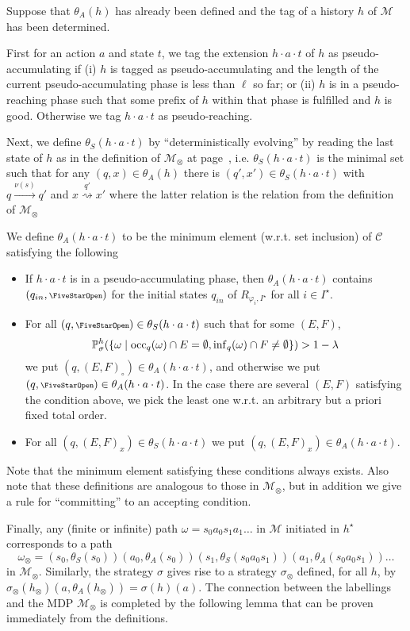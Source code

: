 \documentclass[a4paper,UKenglish]{lipics}
\newcommand{\symbopen}{\text{\scriptsize\FiveStarOpen}}
\newcommand{\tran}[1]{\stackrel{#1}{\rightarrow}}
\newcommand{\mdp}{\mathcal{M}}
\renewcommand{\Pr}[3][]{\ifblank{#1}{\mathbb{P}_{#2}}{\mathbb{P}^{#1}_{#2}}(#3)}
\newcommand{\rabin}{R}
\newcommand{\fix}[1]{{#1^\star}}
\newcommand{\fixI}{\fix{I}}
\newcommand{\fixh}{\fix{h}}
\newcommand{\thetas}{\theta_S}
\newcommand{\thetaa}{\theta_A}
\newcommand{\occu}{\mathrm{occ}}
\newcommand{\infi}{\mathrm{inf}}
\begin{document}
Suppose that $\thetaa(h)$ has already been defined and the tag of a history $h$ of $\mdp$ has been determined. 

First for an action $a$ and state $t$, we tag the extension $h\cdot a \cdot t$ of $h$ as pseudo-accumulating if (i)
$h$ is tagged as pseudo-accumulating and the length of the current pseudo-accumulating phase is less than $\ell$ so far; or (ii)
$h$ is in a pseudo-reaching phase such that some prefix of $h$ within that phase is fulfilled
and $h$ is good.
Otherwise we tag $h\cdot a\cdot t$ as pseudo-reaching.

Next, we define $\thetas(h\cdot a\cdot t)$ by ``deterministically evolving'' by reading the last state of $h$ as in the definition of $\mdp_\otimes$ at page~\pageref{page:det-evolv}, i.e. $\thetas(h\cdot a\cdot t)$ is the minimal set such that for any $(q,x) \in \thetaa(h)$ there is $(q',x') \in \thetas(h\cdot a\cdot t)$ with $q \tran{\nu(s)} q'$ and $x \stackrel{q'}{\rightsquigarrow} x'$ where the latter relation is the relation from the definition of $\mdp_\otimes$

We define $\thetaa(h\cdot a\cdot t)$ to be the minimum element (w.r.t. set inclusion) of $\mathcal{C}$ satisfying the following
\begin{itemize}
	\item If $h\cdot a\cdot t$ is in a pseudo-accumulating phase, then $\thetaa(h\cdot a\cdot t)$ contains $(q_{in},\symbopen)$ for the initial states $q_{in}$ of $\rabin_{\varphi_i,\fixI}$ for all $i\in \fixI$.
	\item For all $(q,\symbopen)\in \thetas(h\cdot a\cdot t)$ such that for some $(E,F)$,
$$
		\Pr[h]{\sigma}{\{\omega \mid \occu_{q}(\omega)\cap E = \emptyset, \infi_{q}(\omega) \cap F \neq \emptyset \}} > 1-\lambda
		$$
		we put $(q,(E,F)_\circ)\in \thetaa(h\cdot a\cdot t)$, and otherwise we put $(q,\symbopen)\in \thetaa(h\cdot a\cdot t)$. In the case there are several $(E,F)$
		satisfying the condition above, we pick the least one w.r.t. an arbitrary but a priori fixed total order.
	\item For all $(q,(E,F)_x)\in \thetas(h\cdot a\cdot t)$ we put $(q,(E,F)_x)\in \thetaa(h\cdot a\cdot t)$.
\end{itemize}
Note that the minimum element satisfying these conditions always exists. Also note that these definitions are analogous to those in $\mdp_\otimes$, but in addition we give a rule for ``committing'' to an accepting condition.

Finally, any (finite or infinite) path $\omega = s_0a_0s_1a_1\ldots$ in $\mdp$ initiated in $\fixh$ corresponds to a path
$$\omega_\otimes=(s_0,\thetas(s_0))(a_0,\thetaa(s_0))(s_1,\thetas(s_0a_0s_1))(a_1,\thetaa(s_0a_0s_1))\ldots$$
in $\mdp_\otimes$. Similarly, the strategy $\sigma$ gives rise to a strategy $\sigma_\otimes$ defined, for all $h$, by
$\sigma_\otimes(h_\otimes)(a,\thetaa(h_\otimes)) = \sigma(h)(a)$.
The connection between the labellings and the MDP $\mdp_\otimes$ is completed by the following lemma that can be proven immediately from the definitions.
\end{document}
